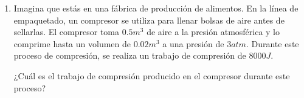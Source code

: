 \documentclass[../main]{subfiles}
\begin{document}
\begin{enumerate}
\item Imagina que estás en una fábrica de producción de alimentos. En la línea de empaquetado, un compresor se utiliza para llenar bolsas de aire antes de sellarlas. El compresor toma $0.5m^3$ de aire a la presión atmosférica y lo comprime hasta un volumen de $0.02m^3$ a una presión de $3atm$. Durante este proceso de compresión, se realiza un trabajo de compresión de $8000J$.

¿Cuál es el trabajo de compresión producido en el compresor durante este proceso?


\end{enumerate}
\end{document}
